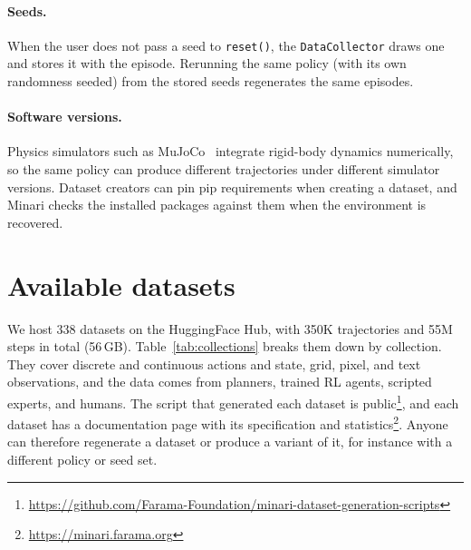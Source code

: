 \documentclass{article}
\newcommand{\numdatasets}{338\xspace}
\newcommand{\numtrajectories}{350K\xspace}
\newcommand{\numsteps}{55M\xspace}
\newcommand{\datasetsize}{56\,GB\xspace}
\begin{document}
\paragraph{Seeds.} When the user does not pass a seed to \verb|reset()|, the \verb|DataCollector| draws one and stores it with the episode. Rerunning the same policy (with its own randomness seeded) from the stored seeds regenerates the same episodes.

\paragraph{Software versions.} Physics simulators such as MuJoCo~\citep{mujoco} integrate rigid-body dynamics numerically, so the same policy can produce different trajectories under different simulator versions. Dataset creators can pin pip requirements when creating a dataset, and Minari checks the installed packages against them when the environment is recovered.

\section{Available datasets}
\label{sec:datasets}

We host \numdatasets datasets on the HuggingFace Hub, with \numtrajectories trajectories and \numsteps steps in total (\datasetsize). Table~\ref{tab:collections} breaks them down by collection. They cover discrete and continuous actions and state, grid, pixel, and text observations, and the data comes from planners, trained RL agents, scripted experts, and humans. The script that generated each dataset is public\footnote{\url{https://github.com/Farama-Foundation/minari-dataset-generation-scripts}}, and each dataset has a documentation page with its specification and statistics\footnote{\url{https://minari.farama.org}}. Anyone can therefore regenerate a dataset or produce a variant of it, for instance with a different policy or seed set.
\end{document}
